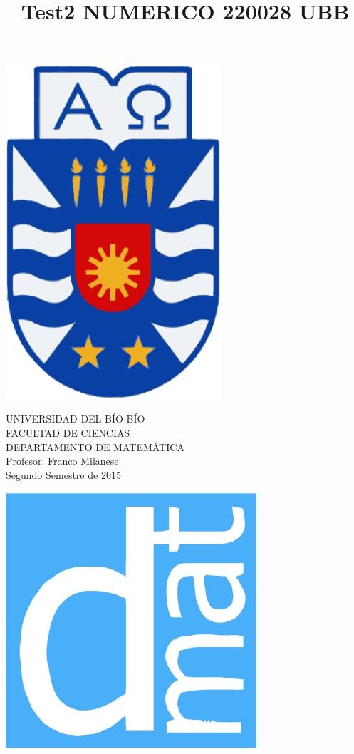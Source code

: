 \documentclass[11pt]{article}
\begin{document}
\title{Test2  NUMERICO 220028 UBB}

{\begin{minipage}{2cm}
\hspace*{1cm}\includegraphics[width=0.6\textwidth]{escubo-ubb.eps}
\end{minipage}
\begin{minipage}{12cm}
\small
{\bf \rm 
{
\begin{center}
{\footnotesize UNIVERSIDAD DEL B\'IO-B\'IO} \\
{\scriptsize FACULTAD DE CIENCIAS}  \\
{\scriptsize DEPARTAMENTO DE MATEM\'ATICA}  \\
{\scriptsize Profesor:  Franco Milanese}\\
{\scriptsize Segundo Semestre de 2015}
\end{center}
}}
\end{minipage}}
{\begin{minipage}{2cm}
\hspace*{-0.5cm}\vspace*{-0.05cm}\includegraphics[width=0.7\textwidth]{escudo-dmat.eps}
\end{minipage}}
\end{document}
